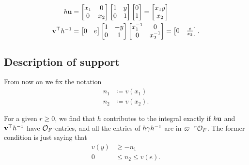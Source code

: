 \begin{align*}
  h \mathbf u &=
    \begin{bmatrix} x_1 & 0 \\ 0 & x_2 \end{bmatrix}
    \begin{bmatrix} 1 & y \\ 0 & 1 \end{bmatrix}
    \begin{bmatrix} 0 \\ 1 \end{bmatrix}
    = \begin{bmatrix} x_1 y \\ x_2 \end{bmatrix} \\
  \mathbf v^\top h^{-1} &=
    \begin{bmatrix} 0 & e \end{bmatrix}
    \begin{bmatrix} 1 & -y \\ 0 & 1 \end{bmatrix}
    \begin{bmatrix} x_1^{-1} & 0 \\ 0 & x_2^{-1} \end{bmatrix}
    = \begin{bmatrix} 0 & \frac{e}{x_2} \end{bmatrix}.
\end{align*}

\subsection{Description of support}
From now on we fix the notation
\begin{align*}
  n_1 &\coloneqq v(x_1) \\
  n_2 &\coloneqq v(x_2).
\end{align*}

For a given $r \ge 0$, we find that $h$ contributes to the integral exactly
if $h\mathbf u$ and $\mathbf v^\top h^{-1}$ have $\mathcal O_F$-entries,
and all the entries of $h \gamma h^{-1}$ are in $\varpi^{-r}\mathcal O_F$.
The former condition is just saying that
\begin{align*}
  v(y) &\ge -n_1 \\
  0 &\le n_2 \le v(e).
\end{align*}
